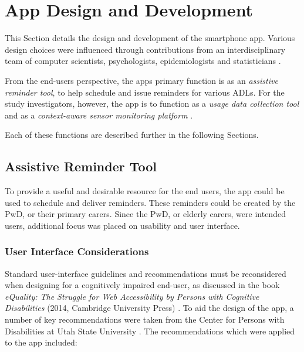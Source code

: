 \section{App Design and Development}
This Section details the design and development of the smartphone app. Various design choices were influenced through contributions from an interdisciplinary team of computer scientists, psychologists, epidemiologists and statisticians \cite{Hartin2014-EMBC}.

From the end-users perspective, the apps primary function is as an \textit{assistive reminder tool}, to help schedule and issue reminders for various ADLs.
For the study investigators, however, the app is to function as a \textit{usage data collection tool} and as a \textit{context-aware sensor monitoring platform} \cite{Hartin2014-EMBC}.

Each of these functions are described further in the following Sections.

\subsection{Assistive Reminder Tool}
To provide a useful and desirable resource for the end users, the app could be used to schedule and deliver reminders. These reminders could be created by the PwD, or their primary carers. Since the PwD, or elderly carers, were intended users, additional focus was placed on usability and user interface.

\subsubsection{User Interface Considerations}
Standard user-interface guidelines and recommendations must be reconsidered when designing for a cognitively impaired end-user, as discussed in the book \textit{eQuality: The Struggle for Web Accessibility by Persons with Cognitive Disabilities} (2014, Cambridge University Press) \cite{Blanck2014}. To aid the design of the app, a number of key recommendations were taken from the Center for Persons with Disabilities at Utah State University \cite{CenterforPersonswithDisabilities2015}. The recommendations which were applied to the app included:

